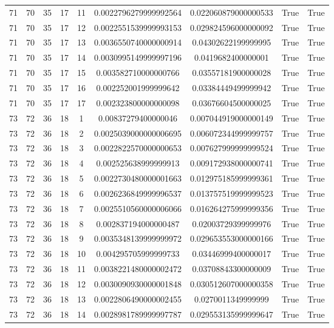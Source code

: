 \documentclass[a4paper,11pt]{article}
\begin{document}
\begin{landscape}
\begin{longtable}{ccccccccc}
71 & 70 & 35 & 17 & 11 & 0.0022796279999992564 & 0.022060879000000533 & True & True \\
71 & 70 & 35 & 17 & 12 & 0.0022551539999993153 & 0.029824596000000092 & True & True \\
71 & 70 & 35 & 17 & 13 & 0.0036550740000000914 & 0.04302622199999995 & True & True \\
71 & 70 & 35 & 17 & 14 & 0.0030995149999997196 & 0.0419682400000001 & True & True \\
71 & 70 & 35 & 17 & 15 & 0.003582710000000766 & 0.03557181900000028 & True & True \\
71 & 70 & 35 & 17 & 16 & 0.002252001999999642 & 0.03384449499999942 & True & True \\
71 & 70 & 35 & 17 & 17 & 0.002323800000000098 & 0.03676604500000025 & True & True \\
73 & 72 & 36 & 18 & 1 & 0.00837279400000046 & 0.007044919000000149 & True & True \\
73 & 72 & 36 & 18 & 2 & 0.0025039000000006695 & 0.006072344999999757 & True & True \\
73 & 72 & 36 & 18 & 3 & 0.0022822570000000653 & 0.007627999999999524 & True & True \\
73 & 72 & 36 & 18 & 4 & 0.002525638999999913 & 0.009172938000000741 & True & True \\
73 & 72 & 36 & 18 & 5 & 0.0022730480000001663 & 0.012975185999999361 & True & True \\
73 & 72 & 36 & 18 & 6 & 0.0026236849999996537 & 0.013757519999999523 & True & True \\
73 & 72 & 36 & 18 & 7 & 0.0025510560000006066 & 0.016264275999999356 & True & True \\
73 & 72 & 36 & 18 & 8 & 0.002837194000000487 & 0.02003729399999976 & True & True \\
73 & 72 & 36 & 18 & 9 & 0.0035348139999999972 & 0.029653553000000166 & True & True \\
73 & 72 & 36 & 18 & 10 & 0.004295705999999733 & 0.03446999400000017 & True & True \\
73 & 72 & 36 & 18 & 11 & 0.0038221480000002472 & 0.03708843300000009 & True & True \\
73 & 72 & 36 & 18 & 12 & 0.0030090930000001848 & 0.030512607000000358 & True & True \\
73 & 72 & 36 & 18 & 13 & 0.0022806490000002455 & 0.0270011349999999 & True & True \\
73 & 72 & 36 & 18 & 14 & 0.0028981789999997787 & 0.029553135999999647 & True & True \\

\end{longtable}
\end{landscape}
\end{document}
